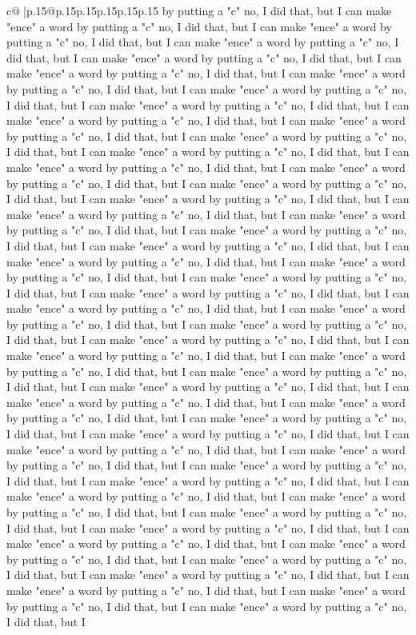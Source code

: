 \documentclass{article}
\begin{document}
{\begin{supertabular}{c@{$\;$}|p{.15\linewidth}@{}p{.15\linewidth}p{.15\linewidth}p{.15\linewidth}p{.15\linewidth}p{.15\linewidth}}
{{{by putting a "c" no, I did that, but I can make "ence" a word by putting a "c" no, I did that, but I can make "ence" a word by putting a "c" no, I did that, but I can make "ence" a word by putting a "c" no, I did that, but I can make "ence" a word by putting a "c" no, I did that, but I can make "ence" a word by putting a "c" no, I did that, but I can make "ence" a word by putting a "c" no, I did that, but I can make "ence" a word by putting a "c" no, I did that, but I can make "ence" a word by putting a "c" no, I did that, but I can make "ence" a word by putting a "c" no, I did that, but I can make "ence" a word by putting a "c" no, I did that, but I can make "ence" a word by putting a "c" no, I did that, but I can make "ence" a word by putting a "c" no, I did that, but I can make "ence" a word by putting a "c" no, I did that, but I can make "ence" a word by putting a "c" no, I did that, but I can make "ence" a word by putting a "c" no, I did that, but I can make "ence" a word by putting a "c" no, I did that, but I can make "ence" a word by putting a "c" no, I did that, but I can make "ence" a word by putting a "c" no, I did that, but I can make "ence" a word by putting a "c" no, I did that, but I can make "ence" a word by putting a "c" no, I did that, but I can make "ence" a word by putting a "c" no, I did that, but I can make "ence" a word by putting a "c" no, I did that, but I can make "ence" a word by putting a "c" no, I did that, but I can make "ence" a word by putting a "c" no, I did that, but I can make "ence" a word by putting a "c" no, I did that, but I can make "ence" a word by putting a "c" no, I did that, but I can make "ence" a word by putting a "c" no, I did that, but I can make "ence" a word by putting a "c" no, I did that, but I can make "ence" a word by putting a "c" no, I did that, but I can make "ence" a word by putting a "c" no, I did that, but I can make "ence" a word by putting a "c" no, I did that, but I can make "ence" a word by putting a "c" no, I did that, but I can make "ence" a word by putting a "c" no, I did that, but I can make "ence" a word by putting a "c" no, I did that, but I can make "ence" a word by putting a "c" no, I did that, but I can make "ence" a word by putting a "c" no, I did that, but I can make "ence" a word by putting a "c" no, I did that, but I can make "ence" a word by putting a "c" no, I did that, but I can make "ence" a word by putting a "c" no, I did that, but I can make "ence" a word by putting a "c" no, I did that, but I can make "ence" a word by putting a "c" no, I did that, but I can make "ence" a word by putting a "c" no, I did that, but I can make "ence" a word by putting a "c" no, I did that, but I can make "ence" a word by putting a "c" no, I did that, but I can make "ence" a word by putting a "c" no, I did that, but I can make "ence" a word by putting a "c" no, I did that, but I can make "ence" a word by putting a "c" no, I did that, but I can make "ence" a word by putting a "c" no, I did that, but I can make "ence" a word by putting a "c" no, I did that, but I can make "ence" a word by putting a "c" no, I did that, but I can make "ence" a word by putting a "c" no, I did that, but I }}}
\end{supertabular}}
\end{document}
